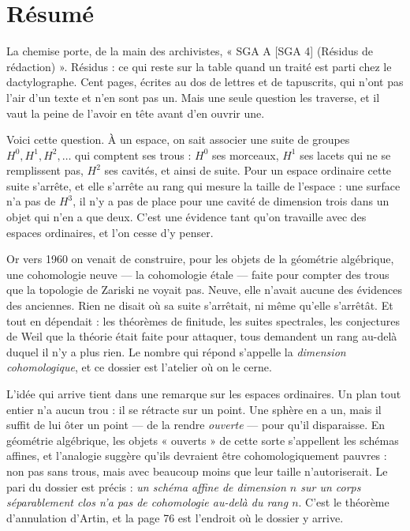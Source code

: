 \documentclass[11pt,a4paper]{article}
\begin{document}
\section*{Résumé}

\begin{resume}
La chemise porte, de la main des archivistes, « SGA A [SGA 4] (Résidus de
rédaction) ». Résidus : ce qui reste sur la table quand un traité est parti
chez le dactylographe. Cent pages, écrites au dos de lettres et de tapuscrits,
qui n'ont pas l'air d'un texte et n'en sont pas un. Mais une seule question les
traverse, et il vaut la peine de l'avoir en tête avant d'en ouvrir une.

Voici cette question. À un espace, on sait associer une suite de groupes
$H^0, H^1, H^2, \dots$ qui comptent ses trous : $H^0$ ses morceaux, $H^1$ ses
lacets qui ne se remplissent pas, $H^2$ ses cavités, et ainsi de suite. Pour un
espace ordinaire cette suite s'arrête, et elle s'arrête au rang qui mesure la
taille de l'espace : une surface n'a pas de $H^3$, il n'y a pas de place pour
une cavité de dimension trois dans un objet qui n'en a que deux. C'est une
évidence tant qu'on travaille avec des espaces ordinaires, et l'on cesse d'y
penser.

Or vers 1960 on venait de construire, pour les objets de la géométrie
algébrique, une cohomologie neuve — la cohomologie étale — faite pour compter
des trous que la topologie de Zariski ne voyait pas. Neuve, elle n'avait
aucune des évidences des anciennes. Rien ne disait où sa suite s'arrêtait, ni
même qu'elle s'arrêtât. Et tout en dépendait : les théorèmes de finitude, les
suites spectrales, les conjectures de Weil que la théorie était faite pour
attaquer, tous demandent un rang au-delà duquel il n'y a plus rien. Le nombre
qui répond s'appelle la \emph{dimension cohomologique}, et ce dossier est
l'atelier où on le cerne.

L'idée qui arrive tient dans une remarque sur les espaces ordinaires. Un plan
tout entier n'a aucun trou : il se rétracte sur un point. Une sphère en a un,
mais il suffit de lui ôter un point — de la rendre \emph{ouverte} — pour qu'il
disparaisse. En géométrie algébrique, les objets « ouverts » de cette sorte
s'appellent les schémas affines, et l'analogie suggère qu'ils devraient être
cohomologiquement pauvres : non pas sans trous, mais avec beaucoup moins que
leur taille n'autoriserait. Le pari du dossier est précis : \emph{un schéma
affine de dimension $n$ sur un corps séparablement clos n'a pas de cohomologie
au-delà du rang $n$}. C'est le théorème d'annulation d'Artin, et la page 76 est
l'endroit où le dossier y arrive.


\end{resume}
\end{document}
